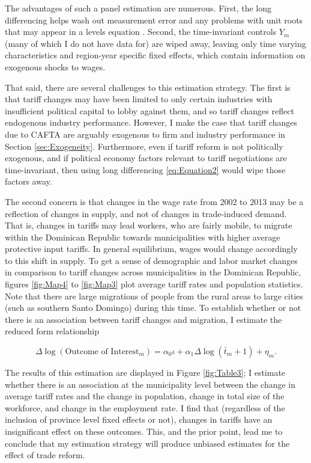 \documentclass[12pt]{article}
\begin{document}
The advantages of such a panel estimation are numerous. First, the long differencing helps 
wash out measurement error and any problems with unit roots that may appear in a levels equation 
\citep{amiti2012trade}.
Second, the time-invariant controls $Y_m$ (many of which I do not have data for) are wiped away,
leaving only time varying characteristics and region-year specific fixed effects, which contain
information on exogenous shocks to wages.

That said, there are several challenges to this estimation strategy. The first is that 
tariff changes may have been limited to only certain industries with insufficient political
capital to lobby against them, and so tariff changes reflect endogenous industry performance.
However, I make the case that tariff changes due to CAFTA are arguably exogenous to 
firm and industry performance in Section \ref{sec:Exogeneity}. Furthermore, even if tariff
reform is not politically exogenous, and if political 
economy factors relevant to tariff negotiations are time-invariant, then using long differencing
\ref{eq:Equation2} would wipe those factors away.

The second concern is that changes in the wage rate from 2002 to 2013 may be a reflection of changes 
in supply, and not of changes in trade-induced demand. That is, changes in tariffs may lead workers,
who are fairly mobile, to migrate within the Dominican Republic towards municipalities with higher 
average protective input tariffs. In general equilibrium, wages would change accordingly to this shift 
in supply. To get a sense of demographic and labor market changes in comparison to tariff changes across
municipalities in the Dominican Republic, figures \ref{fig:Map4} to \ref{fig:Map3} plot average
tariff rates and population statistics. Note that there are large migrations of people from the rural
areas to large cities (such as southern Santo Domingo) during this time. 
To establish whether or not there is an association between tariff changes and migration,
I estimate the reduced form relationship

\begin{equation}
\label{eq:Equation3}
\Delta\log(\text{Outcome of Interest}_m) = \alpha_0 \iota + \alpha_1 \Delta\log(\bar{t}_{m}+1)+\eta_m.
\end{equation}

The results of this estimation are displayed in Figure \ref{fig:Table3}; I estimate whether there
is an association at the municipality level between the change in average tariff rates and the change in 
population, change in total size of the workforce, and change in the employment rate. I find that
(regardless of the inclusion of province level fixed effects or not), changes in tariffs have an
insignificant effect on these outcomes. This, and the prior point, lead me to conclude that my 
estimation strategy will produce unbiased estimates for the effect of trade reform.
\end{document}
